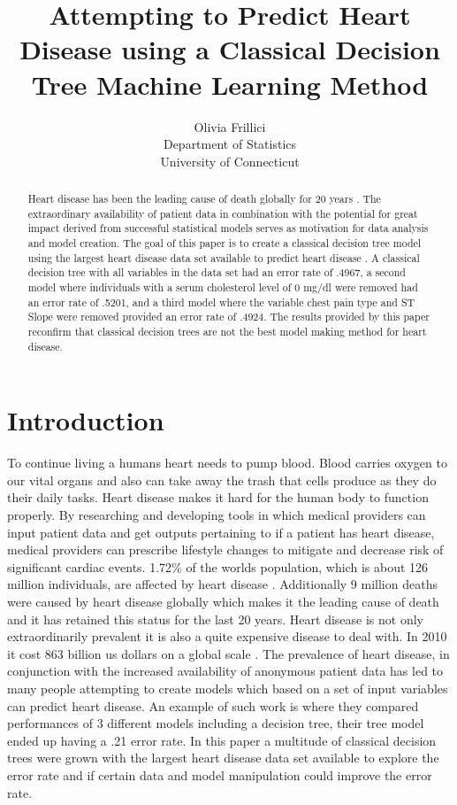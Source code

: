 \documentclass[12pt]{article}
\title{Attempting to Predict Heart Disease using a Classical Decision Tree Machine Learning Method }
\author{Olivia Frillici\\
  Department of Statistics\\
  University of Connecticut
}
\begin{document}
\maketitle
\begin{abstract}
  Heart disease has been the leading cause of death globally for 20 years \citep*{khan2020global}. The extraordinary availability of patient data in combination with the potential for great impact derived from successful statistical models serves as motivation for data analysis and model creation. The goal of this paper is to create a classical decision tree model using the largest heart disease data set available to predict heart disease \citep*{CitekeyMisc}. A classical decision tree with all variables in the data set had an error rate of .4967, a second model where individuals with a serum cholesterol level of 0 mg/dl were removed had an error rate of .5201, and a third model where the variable chest pain type and ST Slope were removed provided an error rate of .4924. The results provided by this paper reconfirm that classical decision trees are not the best model making method for heart disease. 
    \end{abstract}
  \newpage  
    
    \section{Introduction}
    \label{sec:intro}
    
    To continue living a human\textsc{}s heart needs to pump blood. Blood carries oxygen to our vital organs and also can take away the trash that cells produce as they do their daily tasks. Heart disease makes it hard for the human body to function properly. By researching and developing tools in which medical providers can input patient data and get outputs pertaining to if a patient has heart disease, medical providers can prescribe lifestyle changes to mitigate and decrease risk of significant cardiac events. 
1.72\% of the world\textsc{}s population, which is about 126 million individuals, are affected by heart disease \citep{khan2020global}. Additionally 9 million deaths were caused by heart disease globally which makes it the leading cause of death and it has retained this status for the last 20 years\citep{khan2020global}. Heart disease is not only extraordinarily prevalent it is also a quite expensive disease to deal with. In 2010 it cost 863 billion us dollars on a global scale \citep{khan2020global}. 
The prevalence of heart disease, in conjunction with the increased availability of anonymous patient data has led to many people attempting to create models which based on a set of input variables can predict heart disease. An example of such work is \citet{5643666} where they compared performances of 3 different models including a decision tree, their tree model ended up having a .21 error rate. 
In this paper a multitude of classical decision trees were grown with the largest heart disease data set available to explore the error rate and if certain data and model manipulation could improve the error rate.
\end{document}
